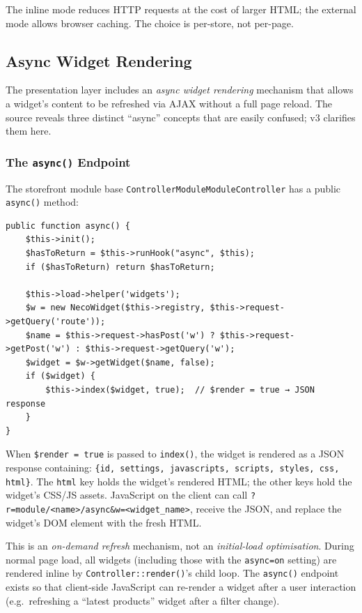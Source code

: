 \documentclass[11pt,a4paper]{article}
\begin{document}
The inline mode reduces HTTP requests at the cost of larger HTML;
the external mode allows browser caching. The choice is per-store,
not per-page.

\subsection{Async Widget Rendering}\label{sec:async-widgets}

The presentation layer includes an \emph{async widget rendering}
mechanism that allows a widget's content to be refreshed via AJAX
without a full page reload. The source reveals three distinct
``async'' concepts that are easily confused; v3 clarifies them
here.

\subsubsection{The \texttt{async()} Endpoint}

The storefront module base
\texttt{ControllerModuleModuleController} has a public
\texttt{async()} method:

\begin{lstlisting}[caption={\texttt{ControllerModuleModuleController::async()} --- the async widget refresh endpoint.},label={lst:async-endpoint}]
public function async() {
    $this->init();
    $hasToReturn = $this->runHook("async", $this);
    if ($hasToReturn) return $hasToReturn;

    $this->load->helper('widgets');
    $w = new NecoWidget($this->registry, $this->request->getQuery('route'));
    $name = $this->request->hasPost('w') ? $this->request->getPost('w') : $this->request->getQuery('w');
    $widget = $w->getWidget($name, false);
    if ($widget) {
        $this->index($widget, true);  // $render = true → JSON response
    }
}
\end{lstlisting}

When \texttt{\$render = true} is passed to \texttt{index()}, the
widget is rendered as a JSON response containing:
\texttt{\{id, settings, javascripts, scripts, styles, css, html\}}.
The \texttt{html} key holds the widget's rendered HTML; the other
keys hold the widget's CSS/JS assets. JavaScript on the client
can call \texttt{?r=module/<name>/async\&w=<widget\_name>}, receive
the JSON, and replace the widget's DOM element with the fresh HTML.

This is an \emph{on-demand refresh} mechanism, not an
\emph{initial-load optimisation}. During normal page load, all
widgets (including those with the \texttt{async=on} setting) are
rendered inline by \texttt{Controller::render()}'s child loop.
The \texttt{async()} endpoint exists so that client-side JavaScript
can re-render a widget after a user interaction (e.g.\ refreshing
a ``latest products'' widget after a filter change).
\end{document}
